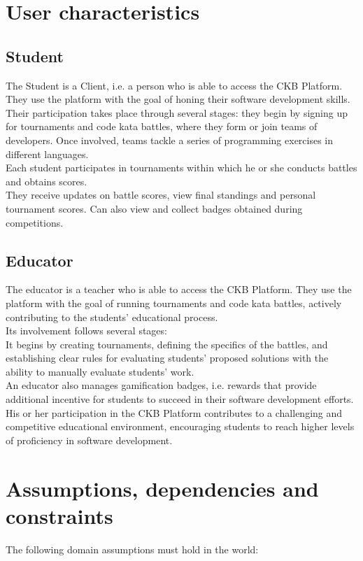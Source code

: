 \section{User characteristics}
\subsection{Student}
The Student is a Client, i.e. a person who is able to access the CKB Platform.\\
They use the platform with the goal of honing their software development skills. Their participation takes place through several stages: they begin by signing up for tournaments and code kata battles, where they form or join teams of developers. Once involved, teams tackle a series of programming exercises in different languages. \\
Each student participates in tournaments within which he or she conducts battles and obtains scores.\\
They receive updates on battle scores, view final standings and personal tournament scores. Can also view and collect badges obtained during competitions.


\subsection{Educator}
The educator is a teacher who is able to access the CKB Platform. They use the platform with the goal of running tournaments and code kata battles, actively contributing to the students' educational process.\\
Its involvement follows several stages:\\
It begins by creating tournaments, defining the specifics of the battles, and establishing clear rules for evaluating students' proposed solutions with the ability to manually evaluate students' work.\\
An educator also manages gamification badges, i.e. rewards that provide additional incentive for students to succeed in their software development efforts.\\
His or her participation in the CKB Platform contributes to a challenging and competitive educational environment, encouraging students to reach higher levels of proficiency in software development.

\section{Assumptions, dependencies and constraints}
The following domain assumptions must hold in the world:

